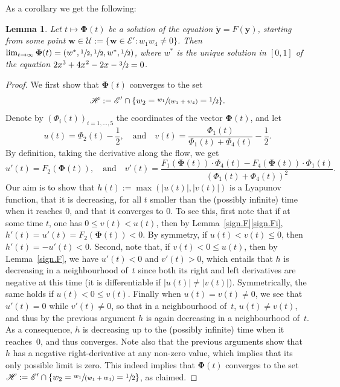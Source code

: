\documentclass[10pt]{amsart}
\let\mathcal\mathscr
\let \nicefrac\sfrac
\newcommand{\spfrac}[2]{\sfrac{#1}{(#2)}}
\numberwithin{equation}{section}
\newtheorem{lemma}[theorem]{Lemma}
\theoremstyle{definition}
\let\bs\boldsymbol
\begin{document}
As a corollary we get the following:
\begin{lemma}\label{lem:conv.lozenge}
Let $t\mapsto \bs \Phi(t)$ be a solution of the equation ${\bs{\dot y}} =F({\bs y})$, starting from some point $\bs w\in \mathcal U:=\{\bs w \in \mathcal E' : w_1w_4\neq 0\}$.
Then $\lim_{t\to \infty} \bs \Phi(t) = (w^*, \nicefrac12, \nicefrac12, w^*, \nicefrac12)$, where $w^*$ is the unique solution in $[0,1]$ of the equation $2x^3+4x^2-2x-\sfrac32=0$.
\end{lemma}
\begin{proof}
We first show that $\bs \Phi(t)$ converges to the set
\[
\mathcal H:= \mathcal E'\cap \{w_2={\spfrac{w_1}{w_1+w_4}}=\nicefrac12\}.
\]
Denote by $(\Phi_i(t))_{i=1,\dots,5}$ the coordinates of the vector $\bs \Phi(t)$, and let
\[
u(t) = \Phi_2(t) - \frac12, \quad \text{and}\quad v(t) = \frac{\Phi_1(t)}{\Phi_1(t)+ \Phi_4(t)} - \frac12.
\]
By definition, taking the derivative along the flow, we get
\[
u'(t) = F_2 (\bs \Phi(t)), \quad \text{and}\quad v'(t) = \frac{F_1(\bs \Phi(t))\cdot \Phi_4(t) - F_4(\bs \Phi(t))\cdot\Phi_1(t)}{(\Phi_1(t) + \Phi_4(t))^2 }.
\]
Our aim is to show that $h(t):=\max(|u(t)|,|v(t)|)$ is a Lyapunov function, \ie that it is decreasing, for all $t$ smaller than the (possibly infinite) time when it reaches $0$, and that it converges to $0$. To see this, first note that if at some time $t$, one has $0\le v(t)<u(t)$,
then by Lemma~\ref{sign.F}\eqref{sign.Fi}, $h'(t) = u'(t) = F_2(\bs \Phi(t)) <0$. By symmetry, if $u(t)<v(t) \le 0$, then $h'(t) = -u'(t) <0$.
Second, note that, if $v(t) < 0 \le u(t)$, then by Lemma~\ref{sign.F}, we have $u'(t) <0$ and $v'(t)>0$, which entails that $h$ is decreasing in a neighbourhood of~$t$ since both its right and left derivatives are negative at this time (it is differentiable if $|u(t)|\neq |v(t)|$).
Symmetrically, the same holds if $u(t)<0\le v(t)$.
Finally when $u(t) = v(t)\neq 0$, we see that $u'(t) = 0$ while
$v'(t)\neq 0$, so that in a neighbourhood of~$t$,
$u(t)\neq v(t)$, and thus by the previous argument $h$ is again decreasing in a neighbourhood of~$t$.
As a consequence, $h$ is decreasing up to the (possibly infinite) time when it reaches~$0$, and thus converges. Note also that the previous arguments show that~$h$ has a negative right-derivative at any non-zero value, which implies that its only possible limit is zero.
This indeed implies that $\bs \Phi(t)$ converges to the set $\mathcal H:= \mathcal E'\cap \{w_2={\spfrac{w_1}{w_1+w_4}}=\nicefrac12\}$, as claimed.


\end{proof}
\end{document}

